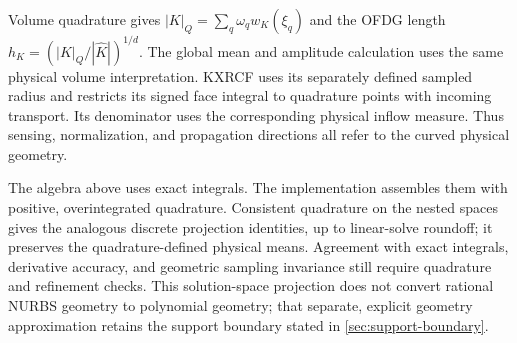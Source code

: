 Volume quadrature gives $|K|_Q=\sum_q\omega_qw_K(\xi_q)$ and the OFDG length
$h_K=(|K|_Q/|\widehat K|)^{1/d}$. The global mean and amplitude calculation
uses the same physical volume interpretation. KXRCF uses its separately defined
sampled radius and restricts its signed face integral to quadrature points
with incoming transport. Its denominator uses the corresponding physical
inflow measure. Thus sensing, normalization, and propagation directions all
refer to the curved physical geometry.

The algebra above uses exact integrals. The implementation assembles them
with positive, overintegrated quadrature. Consistent quadrature on the nested
spaces gives the analogous discrete projection identities, up to linear-solve
roundoff; it preserves the quadrature-defined physical means. Agreement with
exact integrals, derivative accuracy, and geometric sampling invariance still
require quadrature and refinement checks. This solution-space
projection does not convert rational NURBS geometry to polynomial geometry;
that separate, explicit geometry approximation retains the support boundary
stated in \cref{sec:support-boundary}.

